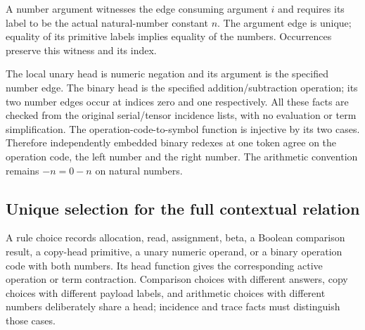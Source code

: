 A number argument witnesses the edge consuming argument $i$ and requires its
label to be the actual natural-number constant $n$. The argument edge is
unique; equality of its primitive labels implies equality of the numbers.
Occurrences preserve this witness and its index.




The local unary head is numeric negation and its argument is the specified
number edge. The binary head is the specified addition/subtraction operation;
its two number edges occur at indices zero and one respectively. All these
facts are checked from the original serial/tensor incidence lists, with no
evaluation or term simplification. The operation-code-to-symbol function is
injective by its two cases. Therefore independently embedded binary redexes
at one token agree on the operation code, the left number and the right
number. The arithmetic convention remains $-n=0-n$ on natural numbers.








\subsection{Unique selection for the full contextual relation}

A rule choice records allocation, read, assignment, beta, a Boolean comparison
result, a copy-head primitive, a unary numeric operand, or a binary operation
code with both numbers. Its head function gives the corresponding active
operation or term contraction. Comparison choices with different answers,
copy choices with different payload labels, and arithmetic choices with
different numbers deliberately share a head; incidence and trace facts must
distinguish those cases.


